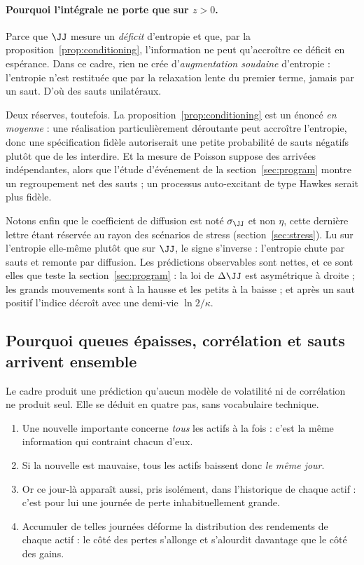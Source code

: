 \paragraph{Pourquoi l'intégrale ne porte que sur $z>0$.} Parce que
$\JJ$ mesure un \emph{déficit} d'entropie et que, par la
proposition~\ref{prop:conditioning}, l'information ne peut qu'accroître ce
déficit en espérance. Dans ce cadre, rien ne crée d'\emph{augmentation soudaine}
d'entropie : l'entropie n'est restituée que par la relaxation lente du premier
terme, jamais par un saut. D'où des sauts unilatéraux.

Deux réserves, toutefois. La proposition~\ref{prop:conditioning} est un énoncé
\emph{en moyenne} : une réalisation particulièrement déroutante peut accroître
l'entropie, donc une spécification fidèle autoriserait une petite probabilité de
sauts négatifs plutôt que de les interdire. Et la mesure de Poisson suppose des
arrivées indépendantes, alors que l'étude d'événement de la
section~\ref{sec:program} montre un regroupement net des sauts ; un processus
auto-excitant de type Hawkes serait plus fidèle.

Notons enfin que le coefficient de diffusion est noté $\sigma_\JJ$ et non
$\eta$, cette dernière lettre étant réservée au rayon des scénarios de stress
(section~\ref{sec:stress}). Lu sur l'entropie elle-même plutôt que sur
$\JJ$, le signe s'inverse : l'entropie chute par sauts et remonte par diffusion.
Les prédictions observables sont nettes, et ce sont elles que teste la
section~\ref{sec:program} : la loi de $\Delta\JJ$ est asymétrique à droite ;
les grands mouvements sont à la hausse et les petits à la baisse ; et après un
saut positif l'indice décroît avec une demi-vie $\ln 2/\kappa$.

\subsection{Pourquoi queues épaisses, corrélation et sauts arrivent ensemble}

Le cadre produit une prédiction qu'aucun modèle de volatilité ni de corrélation
ne produit seul. Elle se déduit en quatre pas, sans vocabulaire technique.

\begin{enumerate}
\item Une nouvelle importante concerne \emph{tous} les actifs à la fois : c'est
la même information qui contraint chacun d'eux.
\item Si la nouvelle est mauvaise, tous les actifs baissent donc \emph{le même
jour}.
\item Or ce jour-là apparaît aussi, pris isolément, dans l'historique de chaque
actif : c'est pour lui une journée de perte inhabituellement grande.
\item Accumuler de telles journées déforme la distribution des rendements de
chaque actif : le côté des pertes s'allonge et s'alourdit davantage que le côté
des gains.
\end{enumerate}

